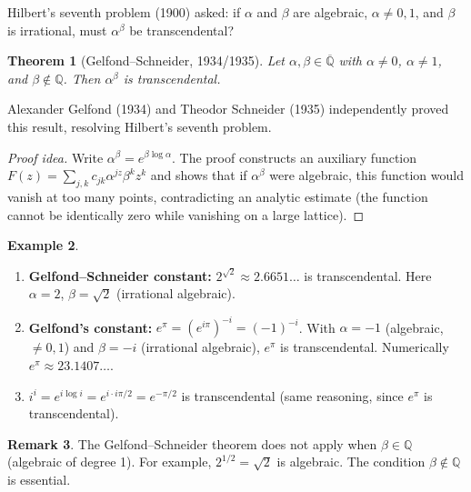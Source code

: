 \documentclass[12pt,a4paper]{amsart}
\newtheorem{theorem}{Theorem}[section]
\theoremstyle{definition}
\newtheorem{example}[theorem]{Example}
\newtheorem{remark}[theorem]{Remark}
\begin{document}
Hilbert's seventh problem (1900) asked: if $\alpha$ and $\beta$ are algebraic,
$\alpha \neq 0, 1$, and $\beta$ is irrational, must $\alpha^\beta$ be transcendental?

\begin{theorem}[Gelfond--Schneider, 1934/1935]
\label{thm:gelfond-schneider}
Let $\alpha, \beta \in \overline{\mathbb{Q}}$ with $\alpha \neq 0$, $\alpha \neq 1$,
and $\beta \notin \mathbb{Q}$. Then $\alpha^\beta$ is transcendental.
\end{theorem}

Alexander Gelfond (1934) and Theodor Schneider (1935) independently proved
this result, resolving Hilbert's seventh problem.

\begin{proof}[Proof idea]
Write $\alpha^\beta = e^{\beta \log \alpha}$. The proof constructs an auxiliary
function $F(z) = \sum_{j,k} c_{jk} \alpha^{jz} \beta^k z^k$ and shows that if
$\alpha^\beta$ were algebraic, this function would vanish at too many points,
contradicting an analytic estimate (the function cannot be identically zero
while vanishing on a large lattice).
\end{proof}

\begin{example}
\begin{enumerate}[label=(\roman*)]
  \item \textbf{Gelfond--Schneider constant:} $2^{\sqrt{2}} \approx 2.6651\ldots$
        is transcendental. Here $\alpha = 2$, $\beta = \sqrt{2}$ (irrational algebraic).
  \item \textbf{Gelfond's constant:} $e^\pi = (e^{i\pi})^{-i} = (-1)^{-i}$.
        With $\alpha = -1$ (algebraic, $\neq 0,1$) and $\beta = -i$
        (irrational algebraic), $e^\pi$ is transcendental. Numerically
        $e^\pi \approx 23.1407\ldots$.
  \item $i^i = e^{i \log i} = e^{i \cdot i\pi/2} = e^{-\pi/2}$ is transcendental
        (same reasoning, since $e^\pi$ is transcendental).
\end{enumerate}
\end{example}

\begin{remark}
The Gelfond--Schneider theorem does not apply when $\beta \in \mathbb{Q}$
(algebraic of degree 1). For example, $2^{1/2} = \sqrt{2}$ is algebraic.
The condition $\beta \notin \mathbb{Q}$ is essential.
\end{remark}


\end{document}

